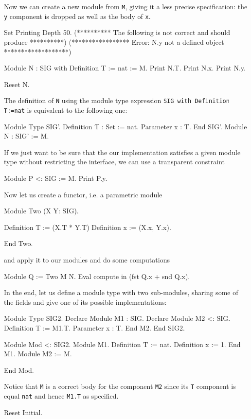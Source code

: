 Now we can create a new module from \texttt{M}, giving it a less
precise specification: the \texttt{y} component is dropped as well
as the body of \texttt{x}.

\begin{coq_eval}
Set Printing Depth 50.
(********** The following is not correct and should produce **********)
(***************** Error: N.y not a defined object *******************)
\end{coq_eval}
\begin{coq_example}
Module N  :  SIG with Definition T := nat  :=  M.
Print N.T.
Print N.x.
Print N.y.
\end{coq_example}
\begin{coq_eval}
Reset N.
\end{coq_eval}

\noindent
The definition of \texttt{N} using the module type expression
\texttt{SIG with Definition T:=nat} is equivalent to the following
one:

\begin{coq_example*}
Module Type SIG'.
  Definition T : Set := nat.
  Parameter x : T.
End SIG'.
Module N : SIG' := M.
\end{coq_example*}
If we just want to be sure that the our implementation satisfies a
given module type without restricting the interface, we can use a
transparent constraint
\begin{coq_example}
Module P <: SIG := M.
Print P.y.
\end{coq_example}
Now let us create a functor, i.e. a parametric module
\begin{coq_example}
Module Two (X Y: SIG).
\end{coq_example}
\begin{coq_example*}
  Definition T := (X.T * Y.T)%
  Definition x := (X.x, Y.x).
\end{coq_example*}
\begin{coq_example}
End Two.
\end{coq_example}
and apply it to our modules and do some computations
\begin{coq_example}
Module Q := Two M N.
Eval compute in (fst Q.x + snd Q.x).
\end{coq_example}
In the end, let us define a module type with two sub-modules, sharing
some of the fields and give one of its possible implementations:
\begin{coq_example}
Module Type SIG2.
  Declare Module M1 : SIG.
  Declare Module M2 <: SIG.
    Definition T := M1.T.
    Parameter x : T.
  End M2.
End SIG2.
\end{coq_example}
\begin{coq_example*}
Module Mod <: SIG2.
  Module M1.
    Definition T := nat.
    Definition x := 1.
  End M1.
  Module M2 := M.
\end{coq_example*}
\begin{coq_example}
End Mod.
\end{coq_example}
Notice that \texttt{M} is a correct body for the component \texttt{M2}
since its \texttt{T} component is equal \texttt{nat} and hence
\texttt{M1.T} as specified.
\begin{coq_eval}
Reset Initial.
\end{coq_eval}

